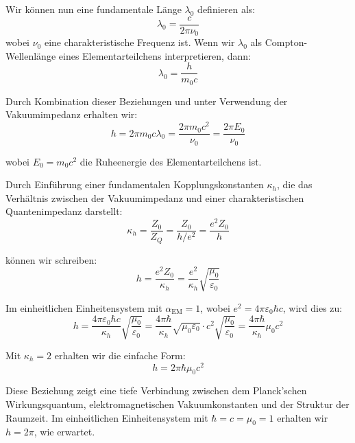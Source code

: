 \documentclass[12pt,a4paper]{article}
\newcommand{\alphaEM}{\alpha_{\text{EM}}}
\begin{document}
	Wir können nun eine fundamentale Länge \(\lambda_0\) definieren als:
	\begin{equation}
		\lambda_0 = \frac{c}{2\pi \nu_0}
	\end{equation}
	wobei \(\nu_0\) eine charakteristische Frequenz ist. Wenn wir \(\lambda_0\) als Compton-Wellenlänge eines Elementarteilchens interpretieren, dann:
	\begin{equation}
		\lambda_0 = \frac{h}{m_0 c}
	\end{equation}
	
	Durch Kombination dieser Beziehungen und unter Verwendung der Vakuumimpedanz erhalten wir:
	\begin{equation}
		h = 2\pi m_0 c \lambda_0 = \frac{2\pi m_0 c^2}{\nu_0} = \frac{2\pi E_0}{\nu_0}
	\end{equation}
	
	wobei \(E_0 = m_0 c^2\) die Ruheenergie des Elementarteilchens ist.
	
	Durch Einführung einer fundamentalen Kopplungskonstanten \(\kappa_h\), die das Verhältnis zwischen der Vakuumimpedanz und einer charakteristischen Quantenimpedanz darstellt:
	\begin{equation}
		\kappa_h = \frac{Z_0}{Z_Q} = \frac{Z_0}{h/e^2} = \frac{e^2 Z_0}{h}
	\end{equation}
	
	können wir schreiben:
	\begin{equation}
		h = \frac{e^2 Z_0}{\kappa_h} = \frac{e^2}{\kappa_h} \sqrt{\frac{\mu_0}{\varepsilon_0}}
	\end{equation}
	
	Im einheitlichen Einheitensystem mit \(\alphaEM = 1\), wobei \(e^2 = 4\pi\varepsilon_0\hbar c\), wird dies zu:
	\begin{equation}
		h = \frac{4\pi\varepsilon_0\hbar c}{\kappa_h} \sqrt{\frac{\mu_0}{\varepsilon_0}} = \frac{4\pi\hbar}{\kappa_h} \sqrt{\mu_0\varepsilon_0} \cdot c^2 \sqrt{\frac{\mu_0}{\varepsilon_0}} = \frac{4\pi\hbar}{\kappa_h} \mu_0 c^2
	\end{equation}
	
	Mit \(\kappa_h = 2\) erhalten wir die einfache Form:
	\begin{equation}
		h = 2\pi\hbar \mu_0 c^2
	\end{equation}
	
	Diese Beziehung zeigt eine tiefe Verbindung zwischen dem Planck'schen Wirkungsquantum, elektromagnetischen Vakuumkonstanten und der Struktur der Raumzeit. Im einheitlichen Einheitensystem mit \(\hbar = c = \mu_0 = 1\) erhalten wir \(h = 2\pi\), wie erwartet.
	
\end{document}
